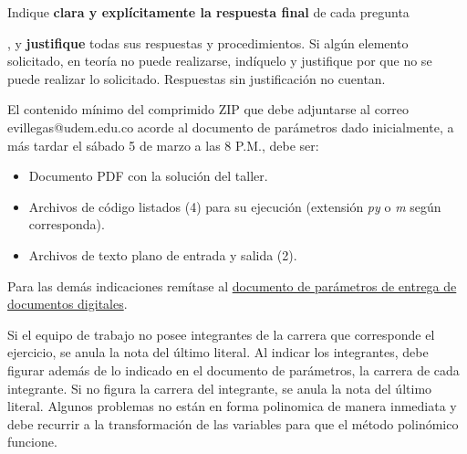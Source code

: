 \documentclass[12pt]{article}
\begin{document}
Indique \textbf{clara y explícitamente la respuesta final} de cada pregunta

, y \textbf{justifique} todas sus respuestas y procedimientos. Si algún elemento solicitado, en teoría no puede realizarse, indíquelo y justifique por que no se puede realizar lo solicitado. Respuestas sin justificación no cuentan.

    El contenido mínimo del comprimido ZIP que debe adjuntarse al correo evillegas@udem.edu.co acorde al documento de parámetros dado inicialmente, a más tardar el sábado 5 de marzo a las 8 P.M., debe ser:
    \begin{itemize}
    \item Documento PDF con la solución del taller.
    \item Archivos de código listados (4) para su ejecución (extensión   \textit{py} o \textit{m} según corresponda).
    \item Archivos de texto plano de entrada y salida (2).
    \end{itemize}

Para las demás indicaciones remítase al \href{https://www.dropbox.com/s/noko8eysm8une33/CondicionesEntrega.pdf?dl=0}{documento de parámetros de entrega de documentos digitales}. %

Si el equipo de trabajo no posee integrantes de la carrera que corresponde el ejercicio, se anula la nota del último literal. Al indicar los integrantes, debe figurar además de lo indicado en el documento de parámetros, la carrera de cada integrante. Si no figura la carrera del integrante, se anula la nota del último literal. Algunos problemas no están en forma polinomica de manera inmediata y debe recurrir a la transformación de las variables para que el método polinómico funcione. %
\end{document}
